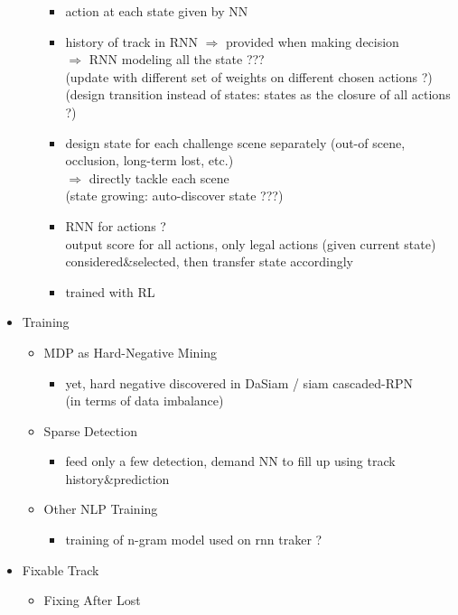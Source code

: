 \begin{itemize}
\begin{itemize}
		\begin{itemize}
		\item action at each state given by NN
		\item history of track in RNN $\Rightarrow$ provided when making decision \\
		$\Rightarrow$ RNN modeling all the state ??? \\ 
		(update with different set of weights on different chosen actions ?) \\
		(design transition instead of states: states as the closure of all actions ?)
		\item design state for each challenge scene separately (out-of scene, occlusion, long-term lost, etc.) \\
		$\Rightarrow$ directly tackle each scene \\
		(state growing: auto-discover state ???)
		\item RNN for actions ? \\
		output score for all actions, only legal actions (given current state) considered\&selected, then transfer state accordingly
		\item trained with RL
		\end{itemize}
	\end{itemize}
\item Training
	\begin{itemize}
	\item MDP as Hard-Negative Mining \\
		\begin{itemize}
		\item yet, hard negative discovered in DaSiam / siam cascaded-RPN \\
		(in terms of data imbalance)
		\end{itemize}
	\item Sparse Detection
		\begin{itemize}
		\item feed only a few detection, demand NN to fill up using track history\&prediction
		\end{itemize}
	\item Other NLP Training
		\begin{itemize}
		\item training of n-gram model used on rnn traker ?
		\end{itemize}
	\end{itemize}
\item Fixable Track
	\begin{itemize}
	\item Fixing After Lost

\end{itemize}
\end{itemize}
